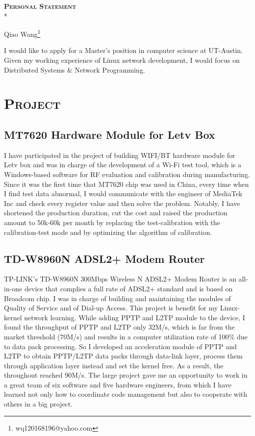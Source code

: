 \documentclass{article}
\begin{document}
	\begin{center}
		\textsc{\textbf{{\LARGE{}Personal Statement}}}\\*
	\end{center}
	\begin{center}
		Qiao Wang\footnote{wq120168196@yahoo.com}
	\end{center}
	\begin{multicols}{2}
		I would like to apply for a Master's position in computer science at UT-Austin. Given my working experience of Linux network development, I would focus on Distributed Systems \& Network Programming.
		\section{\textsc{Project}}
		\subsection{MT7620 Hardware Module for Letv Box}
		I have participated in the project of building WIFI/BT hardware module for Letv box and was in charge of the development of a Wi-Fi test tool, which is a Windows-based software for RF evaluation and calibration during manufacturing. Since it was the first time that MT7620 chip was used in China, every time when I find test data abnormal, I would communicate with the engineer of MediaTek Inc and check every register value and then solve the problem. Notably, I have shortened the production duration, cut the cost and raised the production amount to 50k-60k per month by replacing the test-calibration with the calibration-test mode and by optimizing the algorithm of calibration.
		\subsection{TD-W8960N ADSL2+ Modem Router}
		TP-LINK’s TD-W8960N 300Mbps Wireless N ADSL2+ Modem Router is an all-in-one device that complies a full rate of ADSL2+ standard and is based on Broadcom chip. I was in charge of building and maintaining the modules of Quality of Service and of Dial-up Access. This project is benefit for my Linux-kernel network learning. While adding PPTP and L2TP module to the device, I found the throughput of PPTP and L2TP only 32M/s, which is far from the market threshold (70M/s) and results in a computer utilization rate of 100\% due to data pack processing. So I developed an acceleration module of PPTP and L2TP to obtain PPTP/L2TP data packs through data-link layer, process them through application layer instead and set the kernel free. As a result, the throughout reached 90M/s. The large project gave me an opportunity to work in a great team of six software and five hardware engineers, from which I have learned not only how to coordinate code management but also to cooperate with others in a big project.

\end{multicols}
\end{document}
